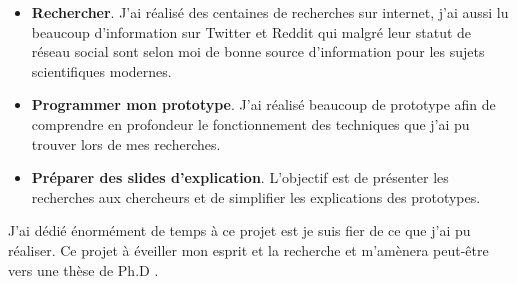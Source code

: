 \begin{itemize}
    \item {\bf Rechercher}. J'ai réalisé des centaines de recherches sur internet, j'ai aussi lu beaucoup d'information
        sur Twitter et Reddit qui malgré leur statut de réseau social sont selon moi de bonne source d'information
        pour les sujets scientifiques modernes.
    \item {\bf Programmer mon prototype}. J'ai réalisé beaucoup de prototype afin de comprendre en profondeur le fonctionnement des techniques que j'ai pu trouver lors de mes recherches.
    \item {\bf Préparer des slides d'explication}. L'objectif est de présenter les recherches aux chercheurs et de simplifier
        les explications des prototypes.
\end{itemize}

J'ai dédié énormément de temps à ce projet est je suis fier de ce que j'ai pu réaliser. Ce projet à éveiller mon esprit et la recherche et m'amènera peut-être vers une thèse de Ph.D \cite{INRIA-ACC}.
